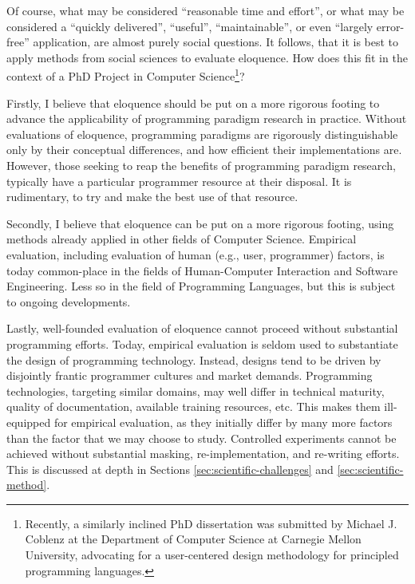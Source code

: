 Of course, what may be considered ``reasonable time and effort'', or
what may be considered a ``quickly delivered'', ``useful'',
``maintainable'', or even ``largely error-free'' application, are
almost purely social questions. It follows, that it is best to apply
methods from social sciences to evaluate eloquence. How does this fit
in the context of a PhD Project in Computer
Science\footnote{Recently, a similarly inclined PhD dissertation was
submitted by Michael J. Coblenz at the Department of Computer Science
at Carnegie Mellon
University\cite{2020-PhD-User-Centerd-Design-of-Principled-PL},
advocating for a user-centered design methodology for principled
programming languages.}?

Firstly, I believe that eloquence should be put on a more rigorous
footing to advance the applicability of programming paradigm research
in practice.  Without evaluations of eloquence, programming paradigms
are rigorously distinguishable only by their conceptual differences,
and how efficient their implementations are. However, those seeking to
reap the benefits of programming paradigm research, typically have a
particular programmer resource at their disposal. It is rudimentary,
to try and make the best use of that resource.

Secondly, I believe that eloquence can be put on a more rigorous
footing, using methods already applied in other fields of Computer
Science. Empirical evaluation, including evaluation of human (e.g.,
user, programmer) factors, is today common-place in the fields of
Human-Computer
Interaction\cite{2013-HCI-An-Empirical-Research-Perspective} and
Software Engineering\cite{2007-Guide-to-Advanced-Empirical-SE}. Less
so in the field of Programming Languages, but this is subject to
ongoing developments\cite{2010-staking-claims,
2016-Programmers-Are-Users-Too,
2017-Methodological-Irregularities-in-PL-Research,
2018-Interdisciplinary-PL-Design}.

Lastly, well-founded evaluation of eloquence cannot proceed without
substantial programming efforts. Today, empirical evaluation is seldom
used to substantiate the design of programming technology. Instead,
designs tend to be driven by disjointly frantic programmer cultures
and market demands. Programming technologies, targeting similar
domains, may well differ in technical maturity, quality of
documentation, available training resources, etc. This makes them
ill-equipped for empirical evaluation, as they initially differ by
many more factors than the factor that we may choose to study.
Controlled experiments cannot be achieved without substantial masking,
re-implementation, and re-writing efforts. This is discussed at depth
in Sections \ref{sec:scientific-challenges} and
\ref{sec:scientific-method}.

